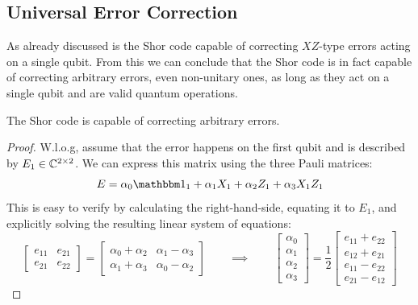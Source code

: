 		\subsection{Universal Error Correction}
			\label{subsec:universalQEC}

			As already discussed is the Shor code capable of correcting \(XZ\)-type errors acting on a single qubit. From this we can conclude that the Shor code is in fact capable of correcting arbitrary errors, even non-unitary ones, as long as they act on a single qubit and are valid quantum operations.

			\begin{theorem}
				The Shor code is capable of correcting arbitrary errors.
			\end{theorem}
			\begin{proof}
				W.l.o.g, assume that the error happens on the first qubit and is described by \( E_1 \in \mathbb{C}^{2 \times 2} \). We can express this matrix using the three Pauli matrices:
				\begin{equation}
					E = \alpha_0 \ID_1 + \alpha_1 X_1 + \alpha_2 Z_1 + \alpha_3 X_1 Z_1
				\end{equation}
				This is easy to verify by calculating the right-hand-side, equating it to \(E_1\), and explicitly solving the resulting linear system of equations:
				\begin{equation}
					\begin{bmatrix}
						e_{11} & e_{21} \\
						e_{21} & e_{22}
					\end{bmatrix}
					=
					\begin{bmatrix}
						\alpha_0 + \alpha_2 & \alpha_1 - \alpha_3 \\
						\alpha_1 + \alpha_3 & \alpha_0 - \alpha_2
					\end{bmatrix}
					\qquad\implies\qquad
					\begin{bmatrix}
						\alpha_0 \\
						\alpha_1 \\
						\alpha_2 \\
						\alpha_3
					\end{bmatrix}
					=
					\frac{1}{2}
					\begin{bmatrix}
						e_{11} + e_{22} \\
						e_{12} + e_{21} \\
						e_{11} - e_{22} \\
						e_{21} - e_{12}
					\end{bmatrix}

\end{equation}
\end{proof}
